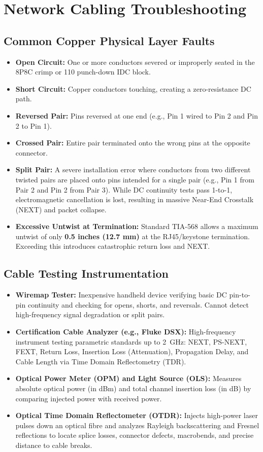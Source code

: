 \section{Network Cabling Troubleshooting}

\subsection{Common Copper Physical Layer Faults}
\begin{itemize}[leftmargin=*]
    \item \textbf{Open Circuit:} One or more conductors severed or improperly seated in the 8P8C crimp or 110 punch-down IDC block.
    \item \textbf{Short Circuit:} Copper conductors touching, creating a zero-resistance DC path.
    \item \textbf{Reversed Pair:} Pins reversed at one end (e.g., Pin 1 wired to Pin 2 and Pin 2 to Pin 1).
    \item \textbf{Crossed Pair:} Entire pair terminated onto the wrong pins at the opposite connector.
    \item \textbf{Split Pair:} A severe installation error where conductors from two different twisted pairs are placed onto pins intended for a single pair (e.g., Pin 1 from Pair 2 and Pin 2 from Pair 3). While DC continuity tests pass 1-to-1, electromagnetic cancellation is lost, resulting in massive Near-End Crosstalk (NEXT) and packet collapse.
    \item \textbf{Excessive Untwist at Termination:} Standard TIA-568 allows a maximum untwist of only \textbf{0.5 inches (12.7 mm)} at the RJ45/keystone termination. Exceeding this introduces catastrophic return loss and NEXT.
\end{itemize}

\subsection{Cable Testing Instrumentation}
\begin{itemize}[leftmargin=*]
    \item \textbf{Wiremap Tester:} Inexpensive handheld device verifying basic DC pin-to-pin continuity and checking for opens, shorts, and reversals. Cannot detect high-frequency signal degradation or split pairs.
    \item \textbf{Certification Cable Analyzer (e.g., Fluke DSX):} High-frequency instrument testing parametric standards up to 2~GHz: NEXT, PS-NEXT, FEXT, Return Loss, Insertion Loss (Attenuation), Propagation Delay, and Cable Length via Time Domain Reflectometry (TDR).
    \item \textbf{Optical Power Meter (OPM) and Light Source (OLS):} Measures absolute optical power (in dBm) and total channel insertion loss (in dB) by comparing injected power with received power.
    \item \textbf{Optical Time Domain Reflectometer (OTDR):} Injects high-power laser pulses down an optical fibre and analyzes Rayleigh backscattering and Fresnel reflections to locate splice losses, connector defects, macrobends, and precise distance to cable breaks.
\end{itemize}

